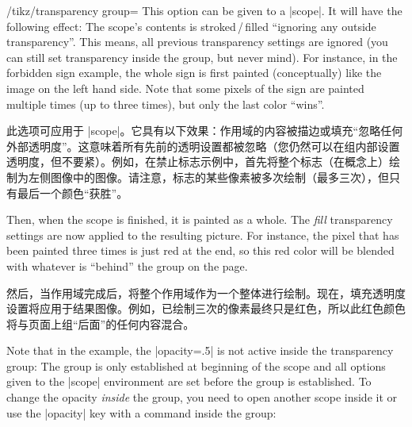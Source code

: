 \begin{key}{/tikz/transparency group=}
    This option can be given to a |scope|. It will have the following effect:
    The scope's contents is stroked\,/\,filled ``ignoring any outside
    transparency''. This means, all previous transparency settings are ignored
    (you can still set transparency inside the group, but never mind). For
    instance, in the forbidden sign example, the whole sign is first painted
    (conceptually) like the image on the left hand side. Note that some pixels
    of the sign are painted multiple times (up to three times), but only the
    last color ``wins''.

    此选项可应用于 |scope|。它具有以下效果：作用域的内容被描边或填充“忽略任何外部透明度”。这意味着所有先前的透明设置都被忽略（您仍然可以在组内部设置透明度，但不要紧）。例如，在禁止标志示例中，首先将整个标志（在概念上）绘制为左侧图像中的图像。请注意，标志的某些像素被多次绘制（最多三次），但只有最后一个颜色“获胜”。

    Then, when the scope is finished, it is painted as a whole. The \emph{fill}
    transparency settings are now applied to the resulting picture. For
    instance, the pixel that has been painted three times is just red at the
    end, so this red color will be blended with whatever is ``behind'' the
    group on the page.

    然后，当作用域完成后，将整个作用域作为一个整体进行绘制。现在，填充透明度设置将应用于结果图像。例如，已绘制三次的像素最终只是红色，所以此红色颜色将与页面上组“后面”的任何内容混合。


\begin{codeexample}[preamble={\usetikzlibrary{patterns,shapes.symbols}}]
\end{codeexample}

    Note that in the example, the |opacity=.5| is not active inside the
    transparency group: The group is only established at beginning of the scope
    and all options given to the |{scope}| environment are set before the group
    is established. To change the opacity \emph{inside} the group, you need to
    open another scope inside it or use the |opacity| key with a command inside
    the group:
 

\end{key}
